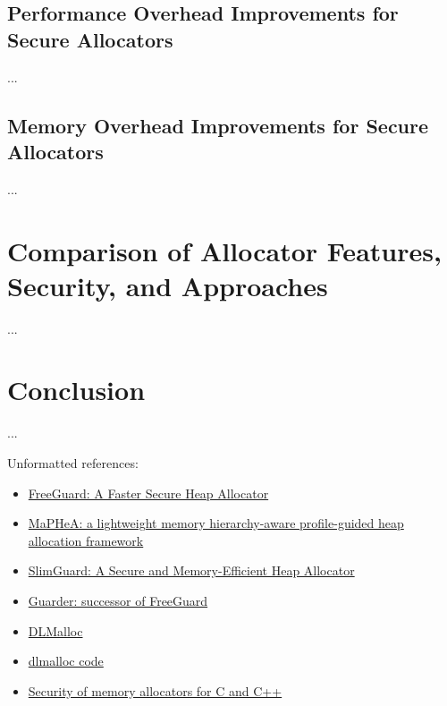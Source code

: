 \documentclass[conference]{IEEEtran}
\begin{document}
\subsection{Performance Overhead Improvements for Secure Allocators}
{\color{red}...}

\subsection{Memory Overhead Improvements for Secure Allocators}
{\color{red}...}

\section{Comparison of Allocator Features, Security, and Approaches}
 {\color{red}...}

\section{Conclusion}
 {\color{red}...}


\color{red}

Unformatted references:

\begin{itemize}
	\item \href{https://dl.acm.org/doi/10.1145/3133956.3133957}{FreeGuard: A Faster Secure Heap Allocator}
	\item \href{https://dl.acm.org/doi/10.1145/3461648.3463844}{MaPHeA: a lightweight memory hierarchy-aware profile-guided heap allocation framework}
	\item \href{https://dl.acm.org/doi/10.1145/3361525.3361532}{SlimGuard: A Secure and Memory-Efficient Heap Allocator}
	\item \href{https://www.usenix.org/conference/usenixsecurity18/presentation/silvestro}{Guarder: successor of FreeGuard}
	\item \href{http://gee.cs.oswego.edu/dl/html/malloc.html}{DLMalloc}
	\item \href{https://github.com/ennorehling/dlmalloc/blob/master/malloc.c}{dlmalloc code}
	\item \href{https://www.researchgate.net/profile/Yves-Younan-2/publication/244152148_Security_of_memory_allocators_for_C_and_C/links/569828ef08aea2d74375eabf/Security-of-memory-allocators-for-C-and-C.pdf}{Security of memory allocators for C and C++}
\end{itemize}
\end{document}
